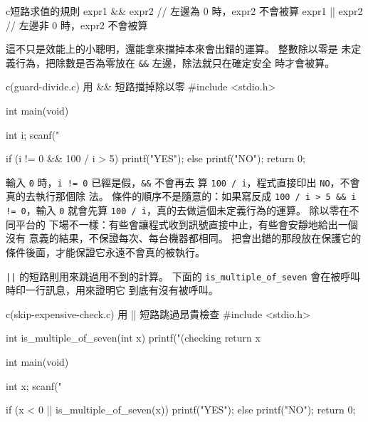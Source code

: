 \begin{code}{c}{短路求值的規則}
expr1 && expr2   // 左邊為 0 時，expr2 不會被算
expr1 || expr2   // 左邊非 0 時，expr2 不會被算
\end{code}

這不只是效能上的小聰明，還能拿來擋掉本來會出錯的運算。 整數除以零是
未定義行為，把除數是否為零放在 \texttt{\&\&} 左邊，除法就只在確定安全
時才會被算。

\begin{example}{c}{(guard-divide.c) 用 \&\& 短路擋掉除以零}
#include <stdio.h>

int main(void) {
    int i;
    scanf("%

    if (i != 0 && 100 / i > 5) {
        printf("YES\n");
    } else {
        printf("NO\n");
    }
    return 0;
}
\end{example}



輸入 \texttt{0} 時，\texttt{i != 0} 已經是假，\texttt{\&\&} 不會再去
算 \texttt{100 / i}，程式直接印出 \texttt{NO}，不會真的去執行那個除
法。 條件的順序不是隨意的：如果寫反成
\texttt{100 / i > 5 \&\& i != 0}，輸入 \texttt{0} 就會先算
\texttt{100 / i}，真的去做這個未定義行為的運算。 除以零在不同平台的
下場不一樣：有些會讓程式收到訊號直接中止，有些會安靜地給出一個沒有
意義的結果，不保證每次、每台機器都相同。 把會出錯的那段放在保護它的
條件後面，才能保證它永遠不會真的被執行。

\texttt{||} 的短路則用來跳過用不到的計算。 下面的
\texttt{is\_multiple\_of\_seven} 會在被呼叫時印一行訊息，用來證明它
到底有沒有被呼叫。

\begin{example}{c}{(skip-expensive-check.c) 用 || 短路跳過昂貴檢查}
#include <stdio.h>

int is_multiple_of_seven(int x) {
    printf("(checking %
    return x %
}

int main(void) {
    int x;
    scanf("%

    if (x < 0 || is_multiple_of_seven(x)) {
        printf("YES\n");
    } else {
        printf("NO\n");
    }
    return 0;
}
\end{example}


